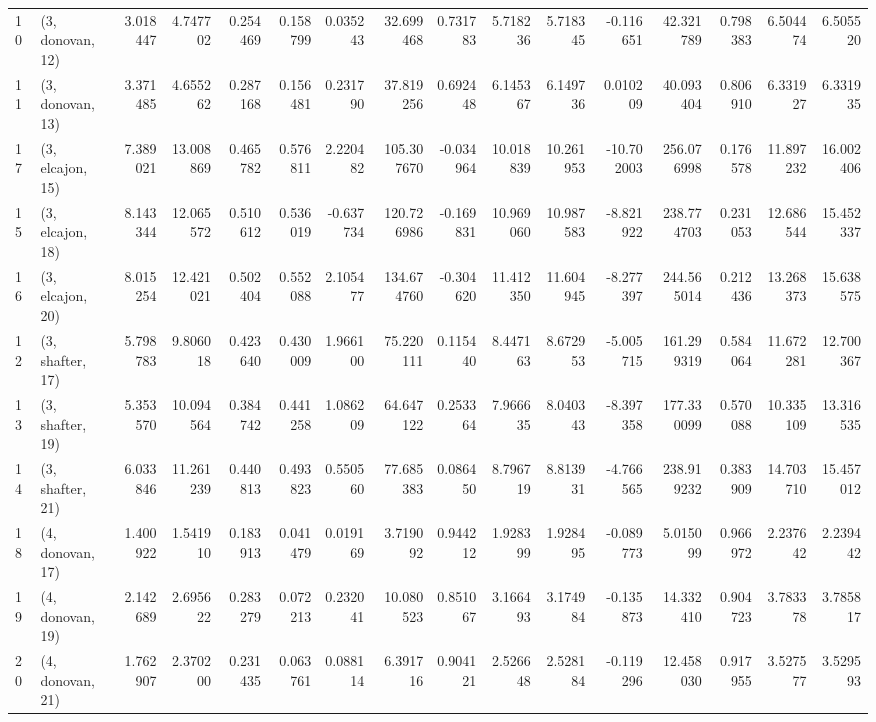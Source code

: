 \begin{tabular}{llrrrrrrrrrrrrrr}
10 &  (3, donovan, 12) &   3.018447 &   4.747702 &   0.254469 &  0.158799 &  0.035243 &   32.699468 &  0.731783 &   5.718236 &   5.718345 &  -0.116651 &   42.321789 &  0.798383 &   6.504474 &   6.505520 \\
11 &  (3, donovan, 13) &   3.371485 &   4.655262 &   0.287168 &  0.156481 &  0.231790 &   37.819256 &  0.692448 &   6.145367 &   6.149736 &   0.010209 &   40.093404 &  0.806910 &   6.331927 &   6.331935 \\
17 &  (3, elcajon, 15) &   7.389021 &  13.008869 &   0.465782 &  0.576811 &  2.220482 &  105.307670 & -0.034964 &  10.018839 &  10.261953 & -10.702003 &  256.076998 &  0.176578 &  11.897232 &  16.002406 \\
15 &  (3, elcajon, 18) &   8.143344 &  12.065572 &   0.510612 &  0.536019 & -0.637734 &  120.726986 & -0.169831 &  10.969060 &  10.987583 &  -8.821922 &  238.774703 &  0.231053 &  12.686544 &  15.452337 \\
16 &  (3, elcajon, 20) &   8.015254 &  12.421021 &   0.502404 &  0.552088 &  2.105477 &  134.674760 & -0.304620 &  11.412350 &  11.604945 &  -8.277397 &  244.565014 &  0.212436 &  13.268373 &  15.638575 \\
12 &  (3, shafter, 17) &   5.798783 &   9.806018 &   0.423640 &  0.430009 &  1.966100 &   75.220111 &  0.115440 &   8.447163 &   8.672953 &  -5.005715 &  161.299319 &  0.584064 &  11.672281 &  12.700367 \\
13 &  (3, shafter, 19) &   5.353570 &  10.094564 &   0.384742 &  0.441258 &  1.086209 &   64.647122 &  0.253364 &   7.966635 &   8.040343 &  -8.397358 &  177.330099 &  0.570088 &  10.335109 &  13.316535 \\
14 &  (3, shafter, 21) &   6.033846 &  11.261239 &   0.440813 &  0.493823 &  0.550560 &   77.685383 &  0.086450 &   8.796719 &   8.813931 &  -4.766565 &  238.919232 &  0.383909 &  14.703710 &  15.457012 \\
18 &  (4, donovan, 17) &   1.400922 &   1.541910 &   0.183913 &  0.041479 &  0.019169 &    3.719092 &  0.944212 &   1.928399 &   1.928495 &  -0.089773 &    5.015099 &  0.966972 &   2.237642 &   2.239442 \\
19 &  (4, donovan, 19) &   2.142689 &   2.695622 &   0.283279 &  0.072213 &  0.232041 &   10.080523 &  0.851067 &   3.166493 &   3.174984 &  -0.135873 &   14.332410 &  0.904723 &   3.783378 &   3.785817 \\
20 &  (4, donovan, 21) &   1.762907 &   2.370200 &   0.231435 &  0.063761 &  0.088114 &    6.391716 &  0.904121 &   2.526648 &   2.528184 &  -0.119296 &   12.458030 &  0.917955 &   3.527577 &   3.529593 \\

\end{tabular}
